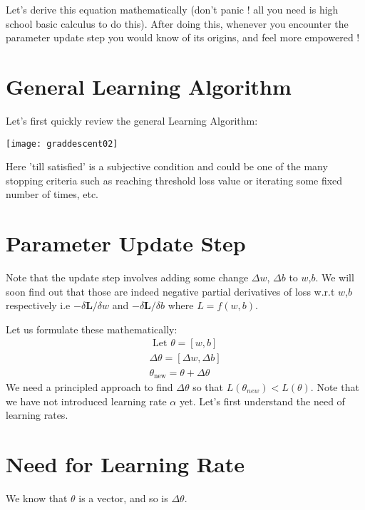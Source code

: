 Let's derive this equation mathematically (don't panic ! all you need is high school basic calculus to do this). After doing this, whenever you encounter the parameter update step you would know of its origins, and feel more empowered !

\section{General Learning Algorithm}

Let's first quickly review the general Learning Algorithm:
\begin{marginfigure}
\texttt{[image: graddescent02]}
\end{marginfigure}

Here 'till satisfied' is a subjective condition and could be one of the many stopping criteria such as reaching threshold loss value or iterating some fixed number of times, etc.

\section{Parameter Update Step}

Note that the update step involves adding  some change $\Delta  w$, $\Delta  b$ to $w$,$b$. We will soon find out that those are indeed negative partial derivatives of loss w.r.t $w$,$b$ respectively i.e $-\delta \mathbf{L} / \delta w$ and $-\delta \mathbf{L} / \delta b$ where $L = f(w,b)$.

Let us formulate these mathematically:
\begin{equation}
\begin{array}{c}{\text { Let } \theta=[w, b]} \\ {\Delta \theta=[\Delta w, \Delta b]} \\ {\theta_{\text {new}}=\theta+\Delta \theta}\end{array}
\end{equation}
We need a principled approach to find $\Delta \theta$ so that $L\left(\theta_{n e w}\right)<L(\theta)$.
Note that we have not introduced learning rate $\alpha$  yet. Let's first understand the need of learning rates.

\section{Need for Learning Rate}

We know that $\theta$ is a vector, and so is $\Delta  \theta$.


